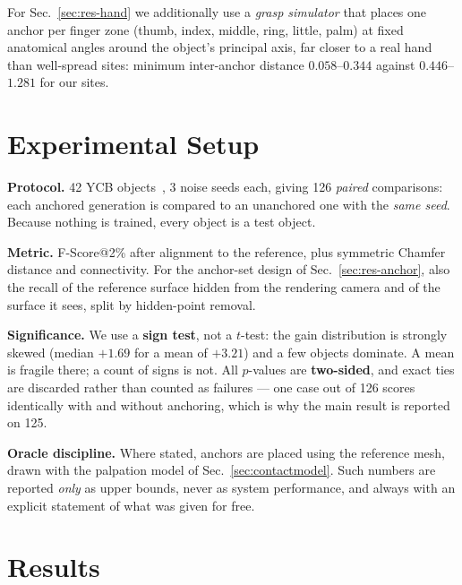\documentclass[conference]{IEEEtran}
\begin{document}
For Sec.~\ref{sec:res-hand} we additionally use a \emph{grasp simulator} that places
one anchor per finger zone (thumb, index, middle, ring, little, palm) at fixed
anatomical angles around the object's principal axis, far closer to a real hand than
well-spread sites: minimum inter-anchor distance $0.058$--$0.344$ against
$0.446$--$1.281$ for our sites.

\section{Experimental Setup}

\textbf{Protocol.} 42 YCB objects~\cite{ycb}, 3 noise seeds each, giving 126
\emph{paired} comparisons: each anchored generation is compared to an unanchored one
with the \emph{same seed}. Because nothing is trained, every object is a test object.

\textbf{Metric.} F-Score@2\% after alignment to the reference, plus symmetric Chamfer
distance and connectivity. For the anchor-set design of Sec.~\ref{sec:res-anchor}, also
the recall of the reference surface hidden from the rendering camera and of the surface
it sees, split by hidden-point removal.

\textbf{Significance.} We use a \textbf{sign test}, not a $t$-test: the gain
distribution is strongly skewed (median $+1.69$ for a mean of $+3.21$) and a few
objects dominate. A mean is fragile there; a count of signs is not. All $p$-values are
\textbf{two-sided}, and exact ties are discarded rather than counted as failures --- one
case out of 126 scores identically with and without anchoring, which is why the main
result is reported on 125.

\textbf{Oracle discipline.} Where stated, anchors are placed using the reference mesh, drawn with the palpation model of Sec.~\ref{sec:contactmodel}.
Such numbers are reported \emph{only} as upper bounds, never as system performance,
and always with an explicit statement of what was given for free.

\section{Results}
\end{document}
